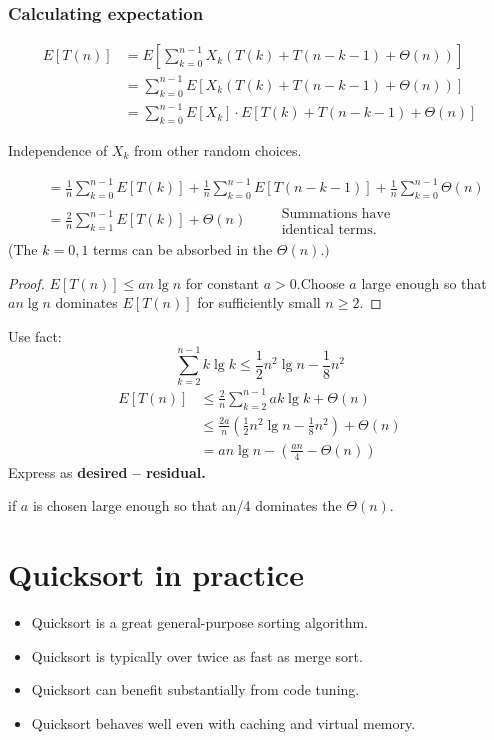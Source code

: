 \documentclass[11pt,toc=twocol]{elegantbook}
\begin{document}
\subsubsection*{Calculating expectation}
$$
\begin{aligned}
E[T(n)] &=E\left[\sum_{k=0}^{n-1} X_{k}(T(k)+T(n-k-1)+\Theta(n))\right] \\
&=\sum_{k=0}^{n-1} E\left[X_{k}(T(k)+T(n-k-1)+\Theta(n))\right] \\
&=\sum_{k=0}^{n-1} E\left[X_{k}\right] \cdot E[T(k)+T(n-k-1)+\Theta(n)]
\end{aligned}
$$
\begin{note}
    Independence of $X_{k}$ from other random choices.  
\end{note}
$$
\begin{aligned}
&=\frac{1}{n} \sum_{k=0}^{n-1} E[T(k)]+\frac{1}{n} \sum_{k=0}^{n-1} E[T(n-k-1)]+\frac{1}{n} \sum_{k=0}^{n-1} \Theta(n)\\
&=\frac{2}{n} \sum_{k=1}^{n-1} E[T(k)]+\Theta(n) \quad \begin{aligned}
&\text { Summations have } \\
&\text { identical terms. }
\end{aligned}
\end{aligned}
$$
(The $k=0,1$ terms can be absorbed in the $\Theta(n) .)$
\begin{proof}
    $E[T(n)] \leq a n \lg n$ for constant $a>0$.Choose $a$ large enough so that $a n \lg n$ dominates $E[T(n)]$ for sufficiently small $n \geq 2$.
\end{proof}
Use fact:
$$
\sum_{k=2}^{n-1} k \lg k \leq \frac{1}{2} n^{2} \lg n-\frac{1}{8} n^{2} 
$$
$$
\begin{aligned}
E[T(n)] & \leq \frac{2}{n} \sum_{k=2}^{n-1} a k \lg k+\Theta(n) \\
& \leq \frac{2 a}{n}\left(\frac{1}{2} n^{2} \lg n-\frac{1}{8} n^{2}\right)+\Theta(n) \\
&=a n \lg n-\left(\frac{a n}{4}-\Theta(n)\right)
\end{aligned}
$$
Express as \textbf{desired – residual.}

if $a$ is chosen large enough so that an/4 dominates the $\Theta(n)$.
\section{Quicksort in practice}
\begin{itemize}
    \item Quicksort is a great general-purpose sorting algorithm.
    \item Quicksort is typically over twice as fast as merge sort.

    \item Quicksort can benefit substantially from code tuning.
    
    \item Quicksort behaves well even with caching and virtual memory.
\end{itemize}
\end{document}
